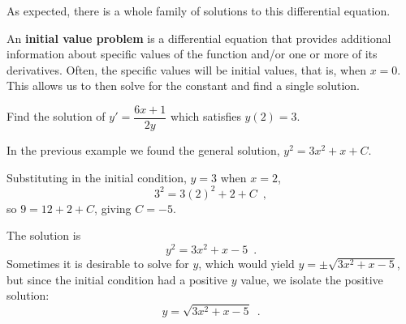 As expected, there is a whole family of solutions to this differential equation.

\begin{definition}
An {\bf initial value problem} is a differential equation that provides additional information about specific values of the function and/or one or more of its derivatives. Often, the specific values will be initial values, that is, when $x=0$. This allows us to then solve for the constant and find a single solution.
\end{definition}

\begin{example}
Find the solution of $y'=\dfrac{6x+1}{2y}$ which satisfies $y(2)=3$.

\begin{solution}
  In the previous example we found the general solution, $y^2=3x^2+x+C$.

Substituting in the initial condition, $y=3$ when $x=2$,
$$3^2=3(2)^2+2+C \enspace ,$$
so $9=12+2+C$, giving $C=-5$.

The solution is
$$y^2=3x^2+x-5 \enspace .$$
Sometimes it is desirable to solve for $y$, which would yield $y=\pm\sqrt{3x^2+x-5}$, but since the initial condition had a positive $y$ value, we isolate the positive solution:
$$y=\sqrt{3x^2+x-5} \enspace .$$
\end{solution}\end{example}

